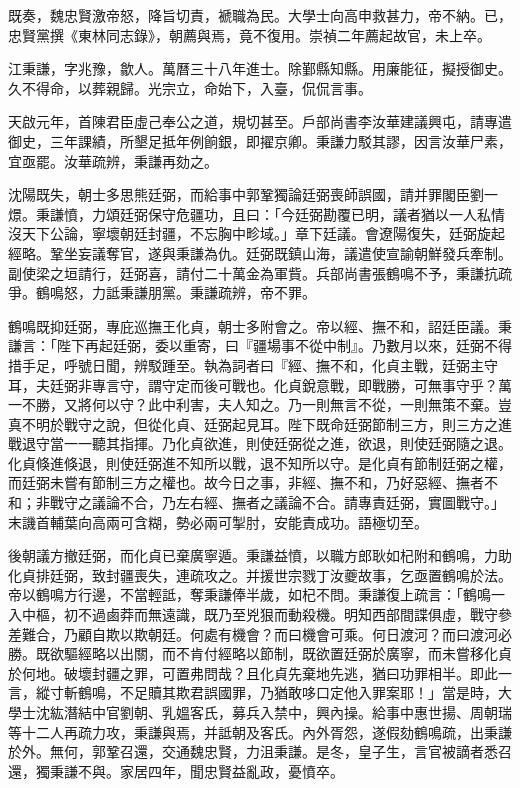 \begin{pinyinscope}
既奏，魏忠賢激帝怒，降旨切責，褫職為民。大學士向高申救甚力，帝不納。已，忠賢黨撰《東林同志錄》，朝薦與焉，竟不復用。崇禎二年薦起故官，未上卒。

江秉謙，字兆豫，歙人。萬曆三十八年進士。除鄞縣知縣。用廉能征，擬授御史。久不得命，以葬親歸。光宗立，命始下，入臺，侃侃言事。

天啟元年，首陳君臣虛己奉公之道，規切甚至。戶部尚書李汝華建議興屯，請專遣御史，三年課績，所墾足抵年例餉銀，即擢京卿。秉謙力駁其謬，因言汝華尸素，宜亟罷。汝華疏辨，秉謙再劾之。

沈陽既失，朝士多思熊廷弼，而給事中郭鞏獨論廷弼喪師誤國，請并罪閣臣劉一燝。秉謙憤，力頌廷弼保守危疆功，且曰：「今廷弼勘覆已明，議者猶以一人私情沒天下公論，寧壞朝廷封疆，不忘胸中畛域。」章下廷議。會遼陽復失，廷弼旋起經略。鞏坐妄議奪官，遂與秉謙為仇。廷弼既鎮山海，議遣使宣諭朝鮮發兵牽制。副使梁之垣請行，廷弼喜，請付二十萬金為軍貲。兵部尚書張鶴鳴不予，秉謙抗疏爭。鶴鳴怒，力詆秉謙朋黨。秉謙疏辨，帝不罪。

鶴鳴既抑廷弼，專庇巡撫王化貞，朝士多附會之。帝以經、撫不和，詔廷臣議。秉謙言：「陛下再起廷弼，委以重寄，曰『疆場事不從中制』。乃數月以來，廷弼不得措手足，呼號日聞，辨駁踵至。執為詞者曰『經、撫不和，化貞主戰，廷弼主守耳，夫廷弼非專言守，謂守定而後可戰也。化貞銳意戰，即戰勝，可無事守乎？萬一不勝，又將何以守？此中利害，夫人知之。乃一則無言不從，一則無策不棄。豈真不明於戰守之說，但從化貞、廷弼起見耳。陛下既命廷弼節制三方，則三方之進戰退守當一一聽其指揮。乃化貞欲進，則使廷弼從之進，欲退，則使廷弼隨之退。化貞倏進倏退，則使廷弼進不知所以戰，退不知所以守。是化貞有節制廷弼之權，而廷弼未嘗有節制三方之權也。故今日之事，非經、撫不和，乃好惡經、撫者不和；非戰守之議論不合，乃左右經、撫者之議論不合。請專責廷弼，實圖戰守。」末譏首輔葉向高兩可含糊，勢必兩可掣肘，安能責成功。語極切至。

後朝議方撤廷弼，而化貞已棄廣寧遁。秉謙益憤，以職方郎耿如杞附和鶴鳴，力助化貞排廷弼，致封疆喪失，連疏攻之。并援世宗戮丁汝夔故事，乞亟置鶴鳴於法。帝以鶴鳴方行邊，不當輕詆，奪秉謙俸半歲，如杞不問。秉謙復上疏言：「鶴鳴一入中樞，初不過鹵莽而無遠識，既乃至兇狠而動殺機。明知西部間諜俱虛，戰守參差難合，乃顧自欺以欺朝廷。何處有機會？而曰機會可乘。何日渡河？而曰渡河必勝。既欲驅經略以出關，而不肯付經略以節制，既欲置廷弼於廣寧，而未嘗移化貞於何地。破壞封疆之罪，可置弗問哉？且化貞先棄地先逃，猶曰功罪相半。即此一言，縱寸斬鶴鳴，不足贖其欺君誤國罪，乃猶敢哆口定他入罪案耶！」當是時，大學士沈紘潛結中官劉朝、乳媼客氏，募兵入禁中，興內操。給事中惠世揚、周朝瑞等十二人再疏力攻，秉謙與焉，并詆朝及客氏。內外胥怨，遂假劾鶴鳴疏，出秉謙於外。無何，郭鞏召還，交通魏忠賢，力沮秉謙。是冬，皇子生，言官被謫者悉召還，獨秉謙不與。家居四年，聞忠賢益亂政，憂憤卒。


\end{pinyinscope}
